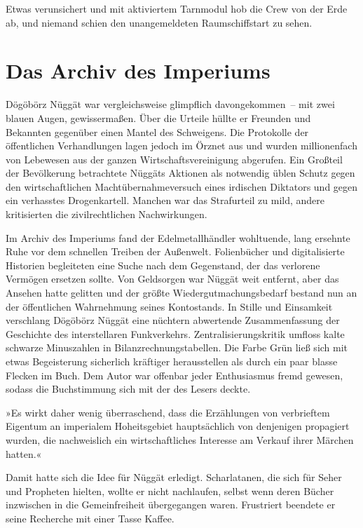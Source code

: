 Etwas verunsichert und mit aktiviertem Tarnmodul hob die Crew von der Erde ab, und niemand schien den unangemeldeten Raumschiffstart zu sehen.


\chapter{Das Archiv des Imperiums}

Dögöbörz Nüggät war vergleichsweise glimpflich davongekommen~– mit zwei blauen Augen, gewissermaßen. Über die Urteile hüllte er Freunden und Bekannten gegenüber einen Mantel des Schweigens. Die Protokolle der öffentlichen Verhandlungen lagen jedoch im Örznet aus und wurden millionenfach von Lebewesen aus der ganzen Wirtschaftsvereinigung abgerufen. Ein Großteil der Bevölkerung betrachtete Nüggäts Aktionen als notwendig üblen Schutz gegen den wirtschaftlichen Machtübernahmeversuch eines irdischen Diktators und gegen ein verhasstes Drogenkartell. Manchen war das Strafurteil zu mild, andere kritisierten die zivilrechtlichen Nachwirkungen.

Im Archiv des Imperiums fand der Edelmetallhändler wohltuende, lang ersehnte Ruhe vor dem schnellen Treiben der Außenwelt. Folienbücher und digitalisierte Historien begleiteten eine Suche nach dem Gegenstand, der das verlorene Vermögen ersetzen sollte. Von Geldsorgen war Nüggät weit entfernt, aber das Ansehen hatte gelitten und der größte Wiedergutmachungsbedarf bestand nun an der öffentlichen Wahrnehmung seines Kontostands. In Stille und Einsamkeit verschlang Dögöbörz Nüggät eine nüchtern abwertende Zusammenfassung der Geschichte des interstellaren Funkverkehrs. Zentralisierungskritik umfloss kalte schwarze Minuszahlen in Bilanzrechnungstabellen. Die Farbe Grün ließ sich mit etwas Begeisterung sicherlich kräftiger herausstellen als durch ein paar blasse Flecken im Buch. Dem Autor war offenbar jeder Enthusiasmus fremd gewesen, sodass die Buchstimmung sich mit der des Lesers deckte.

»Es wirkt daher wenig überraschend, dass die Erzählungen von verbrieftem Eigentum an imperialem Hoheitsgebiet hauptsächlich von denjenigen propagiert wurden, die nachweislich ein wirtschaftliches Interesse am Verkauf ihrer Märchen hatten.«

Damit hatte sich die Idee für Nüggät erledigt. Scharlatanen, die sich für Seher und Propheten hielten, wollte er nicht nachlaufen, selbst wenn deren Bücher inzwischen in die Gemeinfreiheit übergegangen waren. Frustriert beendete er seine Recherche mit einer Tasse Kaffee.

